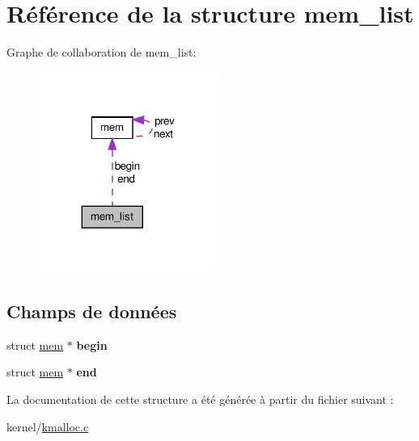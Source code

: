 \hypertarget{structmem__list}{\section{Référence de la structure mem\-\_\-list}
\label{structmem__list}
}


Graphe de collaboration de mem\-\_\-list\-:\nopagebreak
\begin{figure}[H]
\begin{center}
\leavevmode
\includegraphics[width=167pt]{structmem__list__coll__graph}
\end{center}
\end{figure}
\subsection*{Champs de données}
\begin{DoxyCompactItemize}
\item 
\hypertarget{structmem__list_a553c3121bc3eb64cb30d5cda16edb629}{struct \hyperlink{structmem}{mem} $\ast$ {\bfseries begin}}\label{structmem__list_a553c3121bc3eb64cb30d5cda16edb629}

\item 
\hypertarget{structmem__list_a2e221a43fa8f185dda7f582fbb4c507f}{struct \hyperlink{structmem}{mem} $\ast$ {\bfseries end}}\label{structmem__list_a2e221a43fa8f185dda7f582fbb4c507f}

\end{DoxyCompactItemize}


La documentation de cette structure a été générée à partir du fichier suivant \-:\begin{DoxyCompactItemize}
\item 
kernel/\hyperlink{kmalloc_8c}{kmalloc.\-c}\end{DoxyCompactItemize}
